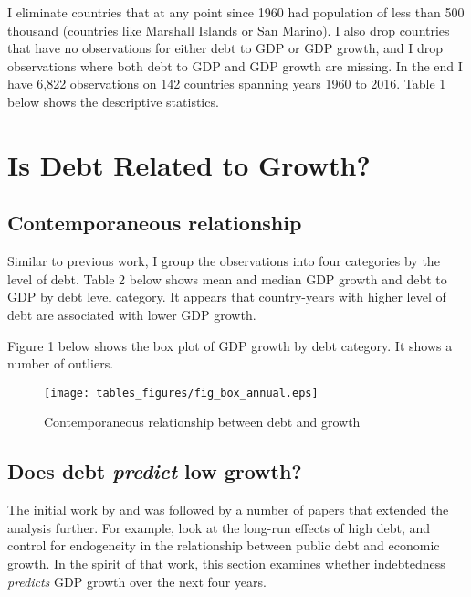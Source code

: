 \documentclass[letterpaper,11pt]{article}
\begin{document}
I eliminate countries that at any point since 1960 had population of less than 500 thousand (countries like Marshall Islands or San Marino). I also drop countries that have no observations for either debt to GDP or GDP growth, and I drop observations where both debt to GDP and GDP growth are missing. In the end I have 6,822 observations on 142 countries spanning years 1960 to 2016. Table 1 below shows the descriptive statistics.




\section{Is Debt Related to Growth?}
\subsection{Contemporaneous relationship}

Similar to previous work, I group the observations into four categories by the level of debt. Table 2 below shows mean and median GDP growth and debt to GDP by debt level category. It appears that country-years with higher level of debt are associated with lower GDP growth.



Figure 1 below shows the box plot of GDP growth by debt category. It shows a number of outliers.

\begin{figure}[h!]
\centering
\texttt{[image: tables\_figures/fig\_box\_annual.eps]}
\caption{Contemporaneous relationship between debt and growth}
\end{figure}

\subsection{Does debt \emph{predict} low growth?}

The initial work by \cite{reinhartrogoffAER2010} and \cite{herndon2014does} was followed by a number of papers that extended the analysis further. For example, \cite{eberhardt2015public} look at the long-run effects of high debt, and \cite{panizza2014public} control for endogeneity in the relationship between public debt and economic growth. In the spirit of that work, this section  examines whether indebtedness \emph{predicts} GDP growth over the next four years.  
\end{document}
